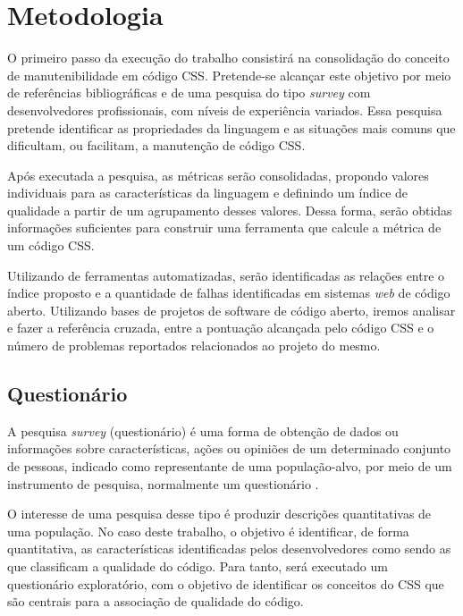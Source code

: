 %
%

\chapter{Metodologia}

O primeiro passo da execução do trabalho consistirá na consolidação do conceito de manutenibilidade em código CSS. Pretende-se alcançar este objetivo por meio de referências bibliográficas e de uma pesquisa do tipo \textit{survey} com desenvolvedores profissionais, com níveis de experiência variados. Essa pesquisa pretende identificar as propriedades da linguagem e as situações mais comuns que dificultam, ou facilitam, a manutenção de código CSS.

Após executada a pesquisa, as métricas serão consolidadas, propondo valores individuais para as características da linguagem e definindo um índice de qualidade a partir de um agrupamento desses valores. Dessa forma, serão obtidas informações suficientes para construir uma ferramenta que calcule a métrica de um código CSS.

Utilizando de ferramentas automatizadas, serão identificadas as relações entre o índice proposto e a quantidade de falhas identificadas em sistemas \textit{web} de código aberto. Utilizando bases de projetos de software de código aberto, iremos analisar e fazer a referência cruzada, entre a pontuação alcançada pelo código CSS e o número de problemas reportados relacionados ao projeto do mesmo.

\section{Questionário}

A pesquisa \textit{survey} (questionário) é uma forma de obtenção de dados ou informações sobre características, ações ou opiniões de um determinado conjunto de pessoas, indicado como representante de uma população-alvo, por meio de um instrumento de pesquisa, normalmente um questionário \cite{Freitas2000}. 

O interesse de uma pesquisa desse tipo é produzir descrições quantitativas de uma população. No caso deste trabalho, o objetivo é identificar, de forma quantitativa, as características identificadas pelos desenvolvedores como sendo as que classificam a qualidade do código. Para tanto, será executado um questionário exploratório, com o objetivo de identificar os conceitos do CSS que são centrais para a associação de qualidade do código.


